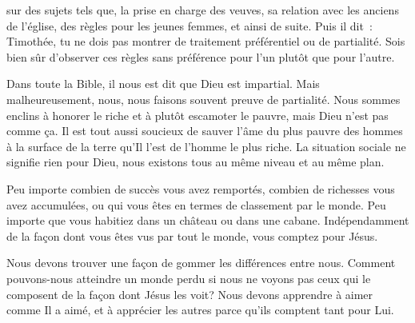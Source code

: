 
 sur des sujets tels que, la prise en charge des veuves,
 sa relation avec les anciens de l'église, des règles pour les jeunes femmes,
 et ainsi de suite. Puis il dit~: 
 \og Timothée, 
 tu ne dois pas montrer de traitement préférentiel ou de partialité.
 Sois bien sûr d'observer ces règles sans préférence pour l'un plutôt
 que pour l'autre. \fg{}

Dans toute la Bible, il nous est dit que Dieu est impartial.
 Mais malheureusement, nous, nous faisons souvent preuve de partialité.
 Nous sommes enclins à honorer le riche et à plutôt escamoter le pauvre,
 mais Dieu n'est pas comme ça. Il est tout aussi soucieux de sauver l'âme
 du plus pauvre des hommes à la surface de la terre qu'Il l'est de l'homme
 le plus riche. La situation sociale ne signifie rien pour Dieu,
 nous existons tous au même niveau et au même plan. 


Peu importe combien de succès vous avez remportés, combien de richesses
 vous avez accumulées, ou qui vous êtes en termes de classement par le monde.
 Peu importe que vous habitiez dans un château ou dans une cabane.
 Indépendamment de la façon dont vous êtes vus par tout le monde,
 vous comptez pour Jésus. 

Nous devons trouver une façon de gommer les différences entre nous.
 Comment pouvons-nous atteindre un monde perdu si nous ne voyons pas
 ceux qui le composent de la façon dont Jésus les voit?
 Nous devons apprendre à aimer comme Il a aimé, et à apprécier les autres
 parce qu'ils comptent tant pour Lui.

\dvrule







